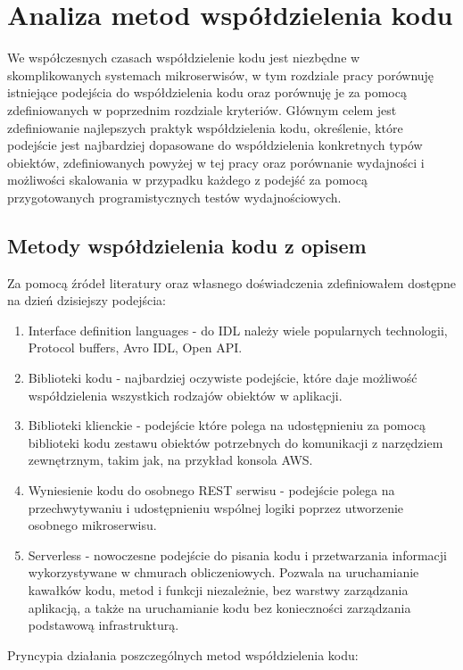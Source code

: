 \documentclass[runningheads,12pt]{llncs}
\begin{document}
\newpage

\section{Analiza metod współdzielenia kodu}

We współczesnych czasach współdzielenie kodu jest niezbędne w skomplikowanych systemach mikroserwisów, w tym rozdziale pracy porównuję istniejące podejścia do współdzielenia kodu oraz porównuję je za pomocą zdefiniowanych w poprzednim rozdziale kryteriów. Głównym celem jest zdefiniowanie najlepszych praktyk współdzielenia kodu, określenie, które podejście jest najbardziej dopasowane do współdzielenia konkretnych typów obiektów, zdefiniowanych powyżej w tej pracy oraz porównanie wydajności i możliwości skalowania w przypadku każdego z podejść za pomocą przygotowanych programistycznych testów wydajnościowych.

\subsection{Metody współdzielenia kodu z opisem}

Za pomocą źródeł literatury oraz własnego doświadczenia zdefiniowałem dostępne na dzień dzisiejszy podejścia:

\begin{enumerate}
    \item Interface definition languages - do IDL należy wiele popularnych technologii, Protocol buffers, Avro IDL, Open API. ~\cite{wiki:interface_description_language}
    \item Biblioteki kodu - najbardziej oczywiste podejście, które daje możliwość współdzielenia wszystkich rodzajów obiektów w aplikacji.
    \item Biblioteki klienckie - podejście które polega na udostępnieniu za pomocą biblioteki kodu zestawu obiektów potrzebnych do komunikacji z narzędziem zewnętrznym, takim jak, na przykład konsola AWS.
    \item Wyniesienie kodu do osobnego REST serwisu - podejście polega na przechwytywaniu i udostępnieniu wspólnej logiki poprzez utworzenie osobnego mikroserwisu.
    \item Serverless - nowoczesne podejście do pisania kodu i przetwarzania informacji wykorzystywane w chmurach obliczeniowych. Pozwala na uruchamianie kawałków kodu, metod i funkcji niezależnie, bez warstwy zarządzania aplikacją, a także na uruchamianie kodu bez konieczności zarządzania podstawową infrastrukturą. ~\cite{ibm_serverless}
\end{enumerate}
Pryncypia działania poszczególnych metod współdzielenia kodu:
\end{document}
